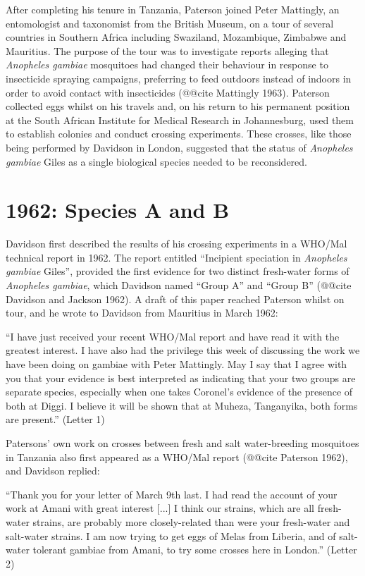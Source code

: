 \documentclass[a4paper,11pt,abstracton,hidelinks]{scrartcl}
\begin{document}
After completing his tenure in Tanzania, Paterson joined Peter Mattingly, an entomologist and taxonomist from the British Museum, on a tour of several countries in Southern Africa including Swaziland, Mozambique, Zimbabwe and Mauritius.
%
The purpose of the tour was to investigate reports alleging that \textit{Anopheles gambiae} mosquitoes had changed their behaviour in response to insecticide spraying campaigns, preferring to feed outdoors instead of indoors in order to avoid contact with insecticides (@@cite Mattingly 1963).
%
Paterson collected eggs whilst on his travels and, on his return to his permanent position at the South African Institute for Medical Research in Johannesburg, used them to establish colonies and conduct crossing experiments.
%
These crosses, like those being performed by Davidson in London, suggested that the status of \textit{Anopheles gambiae} Giles as a single biological species needed to be reconsidered.


\section{1962: Species A and B}

Davidson first described the results of his crossing experiments in a WHO/Mal technical report in 1962.
%
The report entitled ``Incipient speciation in \textit{Anopheles gambiae} Giles'', 
provided the first evidence for two distinct fresh-water forms of \textit{Anopheles gambiae}, which Davidson named ``Group A'' and ``Group B'' (@@cite Davidson and Jackson 1962).
%
A draft of this paper reached Paterson whilst on tour, and he wrote to Davidson from Mauritius in March 1962:
%
\begin{displayquote}
``I have just received your recent WHO/Mal report and have read it with the greatest interest.
%
I have also had the privilege this week of discussing the work we have been doing on gambiae with Peter Mattingly.
%
May I say that I agree with you that your evidence is best interpreted as indicating that your two groups are separate species, especially when one takes Coronel's evidence of the presence of both at Diggi.
%
I believe it will be shown that at Muheza, Tanganyika, both forms are present.'' (Letter 1)
\end{displayquote}


Patersons' own work on crosses between fresh and salt water-breeding mosquitoes in Tanzania also first appeared as a WHO/Mal report (@@cite Paterson 1962), and Davidson replied:
%
\begin{displayquote}
``Thank you for your letter of March 9th last. 
%
I had read the account of your work at Amani with great interest [...] I think our strains, which are all fresh-water strains, are probably more closely-related than were your fresh-water and salt-water strains.
%
I am now trying to get eggs of Melas from Liberia, and of salt-water tolerant gambiae from Amani, to try some crosses here in London.'' (Letter 2)
\end{displayquote}
\end{document}
